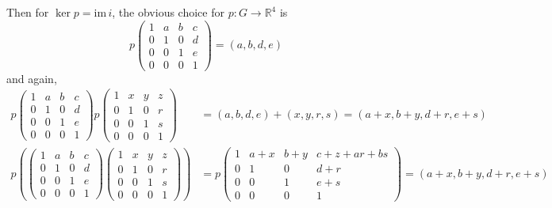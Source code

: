 \documentclass[12pt]{article}
\newcommand{\R}{\mathbb{R}}
\newcommand{\im}{\text{im}\,}
\begin{document}
        Then for $\ker p = \im i$, the obvious choice for $p: G \to \R^4$ is
        \[p\begin{pmatrix}
            1 & a & b & c\\
            0 & 1 & 0 & d\\
            0 & 0 & 1 & e\\
            0 & 0 & 0 & 1 
        \end{pmatrix} = (a, b, d, e)\]
        and again, 
        \begin{align*}
            p\begin{pmatrix}
                1 & a & b & c\\
                0 & 1 & 0 & d\\
                0 & 0 & 1 & e\\
                0 & 0 & 0 & 1 
            \end{pmatrix} p\begin{pmatrix}
                1 & x & y & z\\ 
                0 & 1 & 0 & r\\ 
                0 & 0 & 1 & s\\
                0 & 0 & 0 & 1
            \end{pmatrix} &= (a, b, d, e) + (x, y, r, s) = (a + x, b + y, d +r, e + s)\\ 
            p\left(\begin{pmatrix}
                1 & a & b & c\\
                0 & 1 & 0 & d\\
                0 & 0 & 1 & e\\
                0 & 0 & 0 & 1 
            \end{pmatrix} \begin{pmatrix}
                1 & x & y & z\\ 
                0 & 1 & 0 & r\\ 
                0 & 0 & 1 & s\\
                0 & 0 & 0 & 1
            \end{pmatrix}\right) &= p\begin{pmatrix}
                1 & a + x & b + y & c + z + ar + bs\\ 
                0 & 1 & 0 & d + r \\ 
                0 & 0 & 1 & e + s\\ 
                0 & 0 & 0 & 1
            \end{pmatrix} = (a + x, b + y, d +r, e + s)
        \end{align*}
\end{document}
